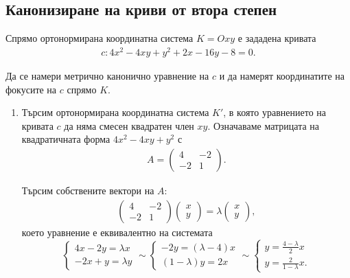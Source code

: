\documentclass[numbers=endperiod, bibliography=totocnumbered]{scrartcl}
\begin{document}
\subsection{Канонизиране на криви от втора степен}

\begin{exercise}
  Спрямо ортонормирана координатна система \( K = Oxy \) е зададена кривата
  \begin{align*}
    c: 4x^2 - 4xy + y^2 + 2x - 16y - 8 = 0.
  \end{align*}

  Да се намери метрично канонично уравнение на \( c \) и да намерят координатите на фокусите на \( c \) спрямо \( K \).
\end{exercise}

\begin{solution}
  \begin{enumerate}
    \item Търсим ортонормирана координатна система \( K' \), в която уравнението на кривата \( c \) да няма смесен квадратен член \( xy \). Означаваме матрицата на квадратичната форма \( 4x^2 - 4xy + y^2 \) с
    \begin{align*}
      A = \begin{pmatrix}
        4 & -2 \\
        -2 & 1
      \end{pmatrix}.
    \end{align*}

    Търсим собствените вектори на \( A \):
    \begin{align*}
      \begin{pmatrix}
        4 & -2 \\
        -2 & 1
      \end{pmatrix}
      \begin{pmatrix}
        x \\ y
      \end{pmatrix}
      =
      \lambda
      \begin{pmatrix}
        x \\ y
      \end{pmatrix},
    \end{align*}
    което уравнение е еквивалентно на системата
    \begin{equation}
      \label{ex:canonization/eigen}
      \begin{cases}
        4x - 2y = \lambda x \\
        -2x + y = \lambda y
      \end{cases}
      \sim
      \begin{cases}
        -2y = (\lambda - 4) x \\
        (1 - \lambda) y = 2x
      \end{cases}
      \sim
      \begin{cases}
        y = \frac {4 - \lambda} 2 x \\
        y = \frac 2 {1 - \lambda} x.
      \end{cases}
    \end{equation}


\end{enumerate}
\end{solution}
\end{document}

